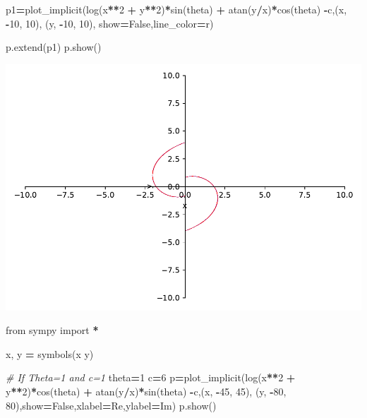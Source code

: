 \documentclass[
]{book}
\newenvironment{Shaded}{\begin{snugshade}}{\end{snugshade}}
\newcommand{\CommentTok}[1]{\textcolor[rgb]{0.56,0.35,0.01}{\textit{#1}}}
\newcommand{\DecValTok}[1]{\textcolor[rgb]{0.00,0.00,0.81}{#1}}
\newcommand{\ImportTok}[1]{#1}
\newcommand{\NormalTok}[1]{#1}
\newcommand{\OperatorTok}[1]{\textcolor[rgb]{0.81,0.36,0.00}{\textbf{#1}}}
\newcommand{\StringTok}[1]{\textcolor[rgb]{0.31,0.60,0.02}{#1}}
\newcommand{\VariableTok}[1]{\textcolor[rgb]{0.00,0.00,0.00}{#1}}
\theoremstyle{definition}
\theoremstyle{definition}
\theoremstyle{definition}
\theoremstyle{definition}
\theoremstyle{remark}
\begin{document}
\begin{Shaded}
\begin{Highlighting}[]
\NormalTok{p1}\OperatorTok{=}\NormalTok{plot\_implicit(log(x}\OperatorTok{**}\DecValTok{2} \OperatorTok{+}\NormalTok{ y}\OperatorTok{**}\DecValTok{2}\NormalTok{)}\OperatorTok{*}\NormalTok{sin(theta) }\OperatorTok{+}\NormalTok{ atan(y}\OperatorTok{/}\NormalTok{x)}\OperatorTok{*}\NormalTok{cos(theta) }\OperatorTok{{-}}\NormalTok{c,(x, }\OperatorTok{{-}}\DecValTok{10}\NormalTok{, }\DecValTok{10}\NormalTok{), (y, }\OperatorTok{{-}}\DecValTok{10}\NormalTok{, }\DecValTok{10}\NormalTok{), show}\OperatorTok{=}\VariableTok{False}\NormalTok{,line\_color}\OperatorTok{=}\StringTok{\textquotesingle{}r\textquotesingle{}}\NormalTok{)}

\NormalTok{p.extend(p1)}
\NormalTok{p.show()}
\end{Highlighting}
\end{Shaded}

\includegraphics{ConformalMapping_files/figure-latex/unnamed-chunk-61-8.pdf}

\begin{Shaded}
\begin{Highlighting}[]
\ImportTok{from}\NormalTok{ sympy }\ImportTok{import} \OperatorTok{*}

\NormalTok{x, y }\OperatorTok{=}\NormalTok{ symbols(}\StringTok{\textquotesingle{}x y\textquotesingle{}}\NormalTok{)}

\CommentTok{\# If Theta=1 and c=1}
\NormalTok{theta}\OperatorTok{=}\DecValTok{1}
\NormalTok{c}\OperatorTok{=}\DecValTok{6}
\NormalTok{p}\OperatorTok{=}\NormalTok{plot\_implicit(log(x}\OperatorTok{**}\DecValTok{2} \OperatorTok{+}\NormalTok{ y}\OperatorTok{**}\DecValTok{2}\NormalTok{)}\OperatorTok{*}\NormalTok{cos(theta) }\OperatorTok{+}\NormalTok{ atan(y}\OperatorTok{/}\NormalTok{x)}\OperatorTok{*}\NormalTok{sin(theta) }\OperatorTok{{-}}\NormalTok{c,(x, }\OperatorTok{{-}}\DecValTok{45}\NormalTok{, }\DecValTok{45}\NormalTok{), (y, }\OperatorTok{{-}}\DecValTok{80}\NormalTok{, }\DecValTok{80}\NormalTok{),show}\OperatorTok{=}\VariableTok{False}\NormalTok{,xlabel}\OperatorTok{=}\StringTok{\textquotesingle{}Re\textquotesingle{}}\NormalTok{,ylabel}\OperatorTok{=}\StringTok{\textquotesingle{}Im\textquotesingle{}}\NormalTok{)}
\NormalTok{p.show()}
\end{Highlighting}
\end{Shaded}
\end{document}
